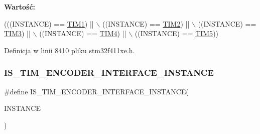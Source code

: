 {\bfseries Wartość\+:}
\begin{DoxyCode}
(((INSTANCE) == \hyperlink{group___peripheral__declaration_ga2e87451fea8dc9380056d3cfc5ed81fb}{TIM1}) || \(\backslash\)
                                             ((INSTANCE) == \hyperlink{group___peripheral__declaration_ga3cfac9f2e43673f790f8668d48b4b92b}{TIM2}) || \(\backslash\)
                                             ((INSTANCE) == \hyperlink{group___peripheral__declaration_ga61ee4c391385607d7af432b63905fcc9}{TIM3}) || \(\backslash\)
                                             ((INSTANCE) == \hyperlink{group___peripheral__declaration_ga91a09bad8bdc7a1cb3d85cf49c94c8ec}{TIM4}) || \(\backslash\)
                                             ((INSTANCE) == \hyperlink{group___peripheral__declaration_ga5125ff6a23a2ed66e2e19bd196128c14}{TIM5}))
\end{DoxyCode}


Definicja w linii 8410 pliku stm32f411xe.\+h.

\mbox{\label{group___exported__macros_gacb14170c4996e004849647d8cb626402}} 
\subsubsection{\texorpdfstring{I\+S\+\_\+\+T\+I\+M\+\_\+\+E\+N\+C\+O\+D\+E\+R\+\_\+\+I\+N\+T\+E\+R\+F\+A\+C\+E\+\_\+\+I\+N\+S\+T\+A\+N\+CE}{IS\_TIM\_ENCODER\_INTERFACE\_INSTANCE}}
{\footnotesize\ttfamily \#define I\+S\+\_\+\+T\+I\+M\+\_\+\+E\+N\+C\+O\+D\+E\+R\+\_\+\+I\+N\+T\+E\+R\+F\+A\+C\+E\+\_\+\+I\+N\+S\+T\+A\+N\+CE(\begin{DoxyParamCaption}\item[{}]{I\+N\+S\+T\+A\+N\+CE }\end{DoxyParamCaption})}


